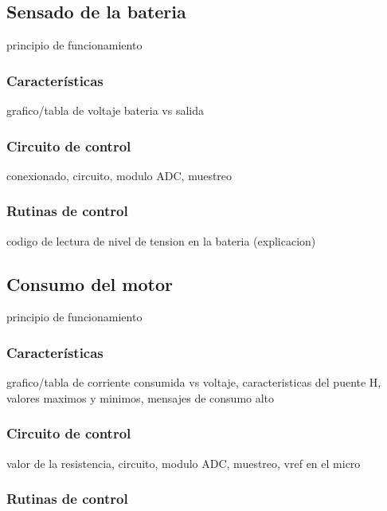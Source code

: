\subsection{Sensado de la bateria}
\label{}

principio de funcionamiento

\subsubsection{Caracter\'isticas}
\label{}

grafico/tabla de voltaje bateria vs salida

\subsubsection{Circuito de control}
\label{}

conexionado, circuito, modulo ADC, muestreo

\subsubsection{Rutinas de control}
\label{}

codigo de lectura de nivel de tension en la bateria (explicacion)

\subsection{Consumo del motor}
\label{}

principio de funcionamiento

\subsubsection{Caracter\'isticas}
\label{}

grafico/tabla de corriente consumida vs voltaje, caracteristicas del puente H, valores maximos y minimos, mensajes de consumo alto

\subsubsection{Circuito de control}
\label{}

valor de la resistencia, circuito, modulo ADC, muestreo, vref en el micro

\subsubsection{Rutinas de control}
\label{}


